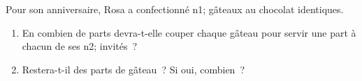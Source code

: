\documentclass[exercice]{thedocument}%
\begin{document}
%
Pour son anniversaire, Rosa a confectionné \<n1; gâteaux au chocolat
identiques.
\begin{enumerate}
    \item En combien de parts devra-t-elle couper chaque
gâteau pour servir une part à chacun de ses \<n2; invités~?
    \item Restera-t-il des parts de gâteau~? Si oui, combien~?
\end{enumerate}
\end{document}
